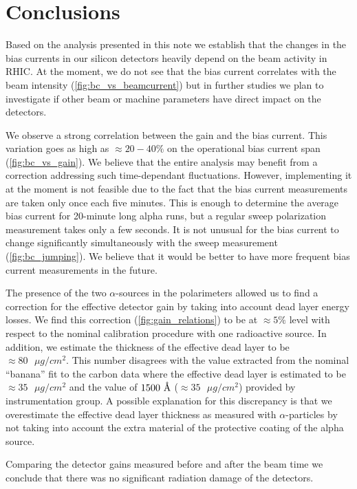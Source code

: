 \documentclass[a4paper,12pt]{article}
\newcommand{\angstrom}{\mbox{\normalfont\AA}}
\begin{document}
\section{Conclusions}

Based on the analysis presented in this note we establish that the changes in
the bias currents in our silicon detectors heavily depend on the beam activity
in RHIC. At the moment, we do not see that the bias current correlates with
the beam intensity (\cref{fig:bc_vs_beamcurrent}) but in further studies we
plan to investigate if other beam or machine parameters have direct impact on
the detectors.

We observe a strong correlation between the gain and the bias current.
This variation goes as high as $\approx 20-40\%$ on the operational bias current
span (\cref{fig:bc_vs_gain}). We believe that the entire analysis
may benefit from a correction addressing such time-dependant fluctuations.
However, implementing it at the moment is not feasible due to
the fact that the bias current measurements are taken only once each five minutes.
This is enough to determine the average bias current for 20-minute long alpha runs, but
a regular sweep polarization measurement takes only a few seconds. It is not
unusual for the bias current to change significantly simultaneously with the sweep measurement (\cref{fig:bc_jumping}).
We believe that it would be better to have more frequent bias current measurements in the future.

The presence of the two $\alpha$-sources in the polarimeters allowed us to find
a correction for the effective detector gain by taking into account dead layer
energy losses. We find this correction (\cref{fig:gain_relations}) to be at $\approx 5\%$ level
with respect to the nominal calibration procedure with one radioactive source.
In addition, we estimate the thickness of the effective dead layer to be
$\approx 80\text{ }\mu g/cm^2$. This number disagrees with the value extracted
from the nominal ``banana'' fit to the carbon data where the effective dead layer is
estimated to be $\approx 35\text{ }\mu g/cm^2$ and the value of $1500\text{ }\angstrom$
($\approx 35\text{ }\mu g/cm^2$) provided by instrumentation group.
A possible explanation for this discrepancy
is that we overestimate the effective dead layer thickness as measured with
$\alpha$-particles by not taking into account the extra material of the protective
coating of the alpha source.

Comparing the detector gains measured before and after the beam time we conclude
that there was no significant radiation damage of the detectors.
\end{document}
